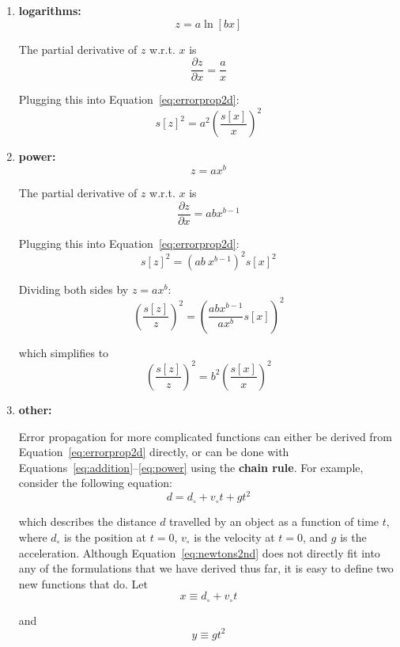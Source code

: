 \begin{enumerate}
\item{\bf logarithms:}
  \[
  z = a \ln[bx]
  \]

  The partial derivative of $z$ w.r.t. $x$ is
  \[
  \frac{\partial z}{\partial x} = \frac{a}{x}
  \]

  Plugging this into Equation~\ref{eq:errorprop2d}:
  \begin{equation}
    s[z]^2 = a^2 \left(\frac{s[x]}{x}\right)^2
    \label{eq:logarithms}
  \end{equation}

\item{\bf power:}
  \[
  z = a x^b
  \]

  The partial derivative of $z$ w.r.t. $x$ is
  \[
  \frac{\partial z}{\partial x} = ab x^{b-1}
  \]

  Plugging this into Equation~\ref{eq:errorprop2d}:
  \[
  s[z]^2 = \left(ab~x^{b-1}\right)^2 s[x]^2
  \]

  Dividing both sides by $z = a x^b$:
  \[
  \left(\frac{s[z]}{z}\right)^2 = \left(\frac{ab x^{b-1}}{a x^{b}}s[x]\right)^2 
  \]

  which simplifies to
  \begin{equation}
    \left(\frac{s[z]}{z}\right)^2 = b^2\left(\frac{s[x]}{x}\right)^2
    \label{eq:power}
  \end{equation}

\item{\bf other:}

  Error propagation for more complicated functions can either be derived
  from Equation~\ref{eq:errorprop2d} directly, or can be done with
  Equations~\ref{eq:addition}--\ref{eq:power} using the \textbf{chain
    rule}. For example, consider the following equation:
  \begin{equation}
    d = d_\circ + v_\circ t + g t^2
    \label{eq:newtons2nd}
  \end{equation}

  \noindent which describes the distance $d$ travelled by an object as a
  function of time $t$, where $d_\circ$ is the position at $t=0$,
  $v_\circ$ is the velocity at $t=0$, and $g$ is the acceleration.
  Although Equation~\ref{eq:newtons2nd} does not directly fit into any
  of the formulations that we have derived thus far, it is easy to
  define two new functions that do. Let
  \begin{equation}
    x \equiv d_\circ + v_\circ t
    \label{eq:xvt}
  \end{equation}

  \noindent and
  \begin{equation}
    y \equiv g t^2
    \label{eq:ygt2}
  \end{equation}


\end{enumerate}
